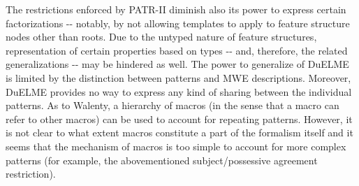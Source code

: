 \documentclass[output=paper
,modfonts
,nonflat
,biblatexbackend=biber
]{langsci/langscibook}
\begin{document}
{{{{{{The\ili{} restrictions\ili{} enforced\ili{} by\ili{} PATR\ili{}-II\ili{} diminish\ili{} also\ili{} its\ili{} power\ili{} to\ili{} express\ili{} certain\ili{} factorizations\ili{} \ili{}-\ili{}-\ili{} notably\ili{},\ili{} by\ili{} not\ili{} allowing\ili{} templates\ili{} to\ili{} apply\ili{} to\ili{} feature\ili{} structure\ili{} nodes\ili{} other\ili{} than\ili{} roots\ili{}.\ili{} Due\ili{} to\ili{} the\ili{} untyped\ili{} nature\ili{} of\ili{} feature\ili{} structures\ili{},\ili{} representation\ili{} of\ili{} certain\ili{} properties\ili{} based\ili{} on\ili{} types\ili{} \ili{}-\ili{}-\ili{} and\ili{},\ili{} therefore\ili{},\ili{} the\ili{} related\ili{} generalizations\ili{} \ili{}-\ili{}-\ili{} may\ili{} be\ili{} hindered\ili{} as\ili{} well\ili{}.\ili{} The\ili{} power\ili{} to\ili{} generalize\ili{} of\ili{} DuELME\ili{} is\ili{} limited\ili{} by\ili{} the\ili{} distinction\ili{} between\ili{} patterns\ili{} and\ili{} MWE\ili{} descriptions\ili{}.\ili{} Moreover\ili{},\ili{} DuELME\ili{} provides\ili{} no\ili{} way\ili{} to\ili{} express\ili{} any\ili{} kind\ili{} of\ili{} sharing\ili{} between\ili{} the\ili{} individual\ili{} patterns\ili{}.\ili{} As\ili{} to\ili{} Walenty\ili{},\ili{} a\ili{} hierarchy\ili{} of\ili{} macros\ili{} \ili{}(in\ili{} the\ili{} sense\ili{} that\ili{} a\ili{} macro\ili{} can\ili{} refer\ili{} to\ili{} other\ili{} macros\ili{})\ili{} can\ili{} be\ili{} used\ili{} to\ili{} account\ili{} for\ili{} repeating\ili{} patterns\ili{}.\ili{} However\ili{},\ili{} it\ili{} is\ili{} not\ili{} clear\ili{} to\ili{} what\ili{} extent\ili{} macros\ili{} constitute\ili{} a\ili{} part\ili{} of\ili{} the\ili{} formalism\ili{} itself\ili{} and\ili{} it\ili{} seems\ili{} that\ili{} the\ili{} mechanism\ili{} of\ili{} macros\ili{} is\ili{} too\ili{} simple\ili{} to\ili{} account\ili{} for\ili{} more\ili{} complex\ili{} patterns\ili{} \ili{}(for\ili{} example\ili{},\ili{} the\ili{} abovementioned\ili{} subject\ili{}/possessive\ili{} agreement\ili{} restriction\ili{})\ili{}.\ili{}
\ili{} \ili{}
}}}}}}
\end{document}
